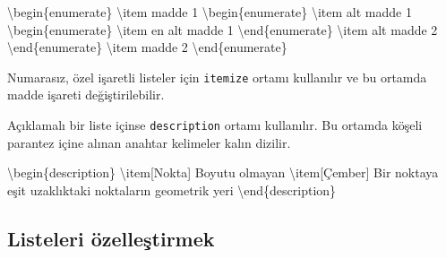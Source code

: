 \documentclass[
  10pt,
]{scrbook}
\newenvironment{Shaded}{\begin{snugshade}}{\end{snugshade}}
\newcommand{\DecValTok}[1]{\textcolor[rgb]{0.00,0.00,0.81}{#1}}
\newcommand{\NormalTok}[1]{#1}
\newcommand{\SpecialCharTok}[1]{\textcolor[rgb]{0.00,0.00,0.00}{#1}}
\begin{document}
\begin{Shaded}
\begin{Highlighting}[]
\NormalTok{\textbackslash{}begin\{enumerate\}}
\NormalTok{ \textbackslash{}item madde }\DecValTok{1}
\NormalTok{  \textbackslash{}begin\{enumerate\}}
\NormalTok{    \textbackslash{}item alt madde }\DecValTok{1}
\NormalTok{      \textbackslash{}begin\{enumerate\}}
\NormalTok{        \textbackslash{}item en alt madde }\DecValTok{1}
\NormalTok{      \textbackslash{}end\{enumerate\}}
\NormalTok{    \textbackslash{}item alt madde }\DecValTok{2}
\NormalTok{  \textbackslash{}end\{enumerate\}}
\NormalTok{ \textbackslash{}item madde }\DecValTok{2}
\NormalTok{\textbackslash{}end\{enumerate\}}
\end{Highlighting}
\end{Shaded}

Numarasız, özel işaretli listeler için \texttt{itemize} ortamı kullanılır ve bu
ortamda madde işareti değiştirilebilir.

\begin{Shaded}
\end{Shaded}

Açıklamalı bir liste içinse \texttt{description} ortamı kullanılır. Bu ortamda
köşeli parantez içine alınan anahtar kelimeler kalın dizilir.

\begin{Shaded}
\begin{Highlighting}[]
\NormalTok{\textbackslash{}begin\{description\}}
\NormalTok{\textbackslash{}item[Nokta] Boyutu olmayan}
\NormalTok{\textbackslash{}item[Çember] Bir noktaya eşit}
\NormalTok{uzaklıktaki noktaların geometrik yeri}
\NormalTok{\textbackslash{}end\{description\}}
\end{Highlighting}
\end{Shaded}

\hypertarget{listeleri-uxf6zelleux15ftirmek}{%
\subsection{Listeleri özelleştirmek}\label{listeleri-uxf6zelleux15ftirmek}}
\end{document}
